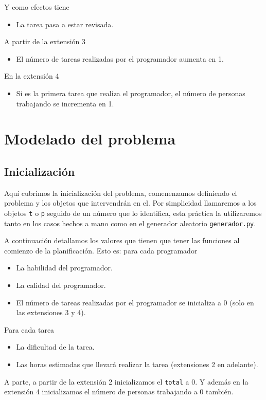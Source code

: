 \documentclass[12pt, titlepage]{article}
\begin{document}
Y como efectos tiene
\begin{itemize}
    \item La tarea pasa a estar revisada.
\end{itemize}
A partir de la extensión 3
\begin{itemize}
    \item El número de tareas realizadas por el programador aumenta en 1.
\end{itemize}
En la extensión 4
\begin{itemize}
    \item Si es la primera tarea que realiza el programador, el número de
        personas trabajando se incrementa en 1.
\end{itemize}


\section{Modelado del problema}
\subsection{Inicialización}
Aquí cubrimos la inicialización del problema, comenenzamos definiendo el
problema y los objetos que intervendrán en el. Por simplicidad llamaremos a los
objetos \texttt{t} o \texttt{p} seguido de un número que lo identifica, esta
práctica la utilizaremos tanto en los casos hechos a mano como en el generador
aleatorio \texttt{generador.py}.

A continuación detallamos los valores que tienen que tener las funciones al
comienzo de la planificación. Esto es: para cada programador
\begin{itemize}
    \item La habilidad del programador.
    \item La calidad del programador.
    \item El número de tareas realizadas por el programador se inicializa a 0
        (solo en las extensiones 3 y 4).
\end{itemize}
Para cada tarea
\begin{itemize}
    \item La dificultad de la tarea.
    \item Las horas estimadas que llevará realizar la tarea (extensiones 2 en
        adelante).
\end{itemize}

A parte, a partir de la extensión 2 inicializamos el \texttt{total} a 0. Y
además en la extensión 4 inicializamos el número de personas trabajando a 0
también.
\end{document}

